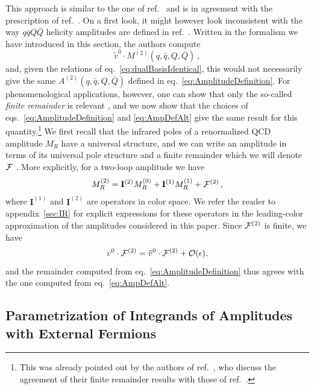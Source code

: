 This approach is similar to the one of
ref.~\cite{Glover:2004si} and is in
agreement with the prescription of ref.~\cite{Anger:2018ove}.
On a first look, it might however look inconsistent with the 
way $q\bar qQ\bar Q$ helicity amplitudes are defined in
ref.~\cite{DeFreitas:2004kmi}. Written in the formalism
we have introduced in this section, the authors compute
\begin{equation}
	\label{eq:AmpDefAlt}
	\tilde v^0\cdot M^{(2)}
	(q,\bar q,Q,\bar Q)\,,
\end{equation}
and, given the relations of eq.~\eqref{eq:dualBasisIdentical}, this
would not necessarily give the same 
$A^{(2)}(q,\bar q,Q,\bar Q)$ defined in 
eq.~\eqref{eq:AmplitudeDefinition}. For
phenomenological applications, however, 
one can show that only the
so-called \emph{finite remainder} is relevant 
\cite{Weinzierl:2011uz},
and we now show that the choices of 
eqs.~\eqref{eq:AmplitudeDefinition} and \eqref{eq:AmpDefAlt}
give the same result for this quantity.\footnote{This was 
already pointed out by the authors of 
ref.~\cite{DeFreitas:2004kmi}, who discuss the agreement of 
their finite remainder results with those of ref.~\cite{Glover:2004si}.}
We first recall that the infrared poles of a renormalized QCD
amplitude $M_R$ have a universal structure, and we can
write an amplitude in terms of its universal pole structure
and a finite remainder
which we will denote $\mathcal{F}$
\cite{Catani:1998bh,Sterman:2002qn,Becher:2009cu,Gardi:2009qi}.
More explicitly, 
for a two-loop amplitude we have
\begin{equation}\label{eq:remainderDef}
	M^{(2)}_R=
	\mathbf{I}^{(2)}M^{(0)}_R
	+\mathbf{I}^{(1)}M^{(1)}_R
	+\mathcal{F}^{(2)}\,,
\end{equation}
where $\mathbf{I}^{(1)}$ and $\mathbf{I}^{(2)}$ are operators in color
space. We refer the reader to appendix~\ref{sec:IR} for 
explicit expressions for these operators in the leading-color
approximation of the amplitudes considered in this paper. Since
$\mathcal{F}^{(2)}$ is finite, we have
\begin{equation}
	v^0\cdot \mathcal{F}^{(2)}
	=\tilde v^0\cdot \mathcal{F}^{(2)}+\mathcal{O}(\epsilon),
        \label{eq:RemainderEquivalence}
\end{equation}
and the remainder computed from 
eq.~\eqref{eq:AmplitudeDefinition} thus agrees with the 
one computed from eq.~\eqref{eq:AmpDefAlt}. 


\subsection{Parametrization of Integrands of Amplitudes with External Fermions}
\label{sec:ParamIntegrands}

